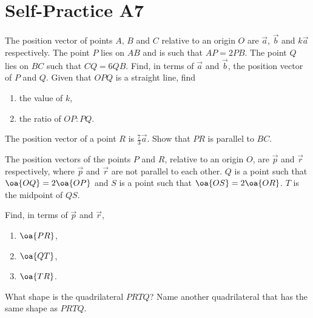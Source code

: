 \section{Self-Practice A7}

\begin{problem}
    The position vector of points $A$, $B$ and $C$ relative to an origin $O$ are $\vec a$, $\vec b$ and $k \vec a$ respectively. The point $P$ lies on $AB$ and is such that $AP = 2PB$. The point $Q$ lies on $BC$ such that $CQ = 6QB$. Find, in terms of $\vec a$ and $\vec b$, the position vector of $P$ and $Q$. Given that $OPQ$ is a straight line, find
    \begin{enumerate}
        \item the value of $k$,
        \item the ratio of $OP:PQ$.
    \end{enumerate}
    The position vector of a point $R$ is $\frac73 \vec a$. Show that $PR$ is parallel to $BC$.
\end{problem}

\begin{problem}
    The position vectors of the points $P$ and $R$, relative to an origin $O$, are $\vec p$ and $\vec r$ respectively, where $\vec p$ and $\vec r$ are not parallel to each other. $Q$ is a point such that $\oa{OQ} = 2\oa{OP}$ and $S$ is a point such that $\oa{OS} = 2\oa{OR}$. $T$ is the midpoint of $QS$.

    Find, in terms of $\vec p$ and $\vec r$,
    \begin{enumerate}
        \item $\oa{PR}$,
        \item $\oa{QT}$,
        \item $\oa{TR}$.
    \end{enumerate}

    What shape is the quadrilateral $PRTQ$? Name another quadrilateral that has the same shape as $PRTQ$.
\end{problem}

